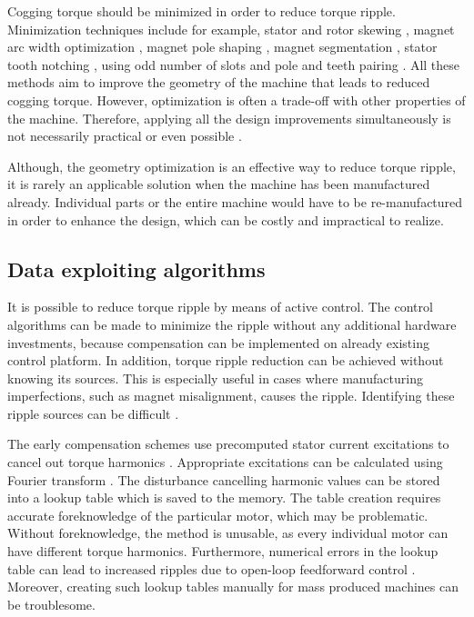 Cogging torque should be minimized in order to reduce torque ripple. Minimization techniques include for example, stator and rotor skewing \cite{CTR_HW:1994, CTR_HW:2001, CTR_HW:2002, CTR_Analytical:2009, CTR_HW:2013}, magnet arc width optimization \cite{CTR_HW:2002, CTR_HW:2003, CTR_HW:2001}, magnet pole shaping \cite{CTR_HW:1994, CTR_HW:2004}, magnet segmentation \cite{CTR_HW:2002, CTR:2010, CTR_SW:2017}, stator tooth notching \cite{CTR_HW:1994, CTR_HW:2002}, using odd number of slots \cite{CTR_HW_SLOTN:2011} and pole and teeth pairing \cite{CTR_HW:2001}. All these methods aim to improve the geometry of the machine that leads to reduced cogging torque. However, optimization is often a trade-off with other properties of the machine. Therefore, applying all the design improvements simultaneously is not necessarily practical or even possible \cite{CTR_HW:2002, CTR_HW:2013}.

Although, the geometry optimization is an effective way to reduce torque ripple, it is rarely an applicable solution when the machine has been manufactured already. Individual parts or the entire machine would have to be re-manufactured in order to enhance the design, which can be costly and impractical to realize.

\subsection{Data exploiting algorithms}
 
It is possible to reduce torque ripple by means of active control. The control algorithms can be made to minimize the ripple without any additional hardware investments, because compensation can be implemented on already existing control platform. In addition, torque ripple reduction can be achieved without knowing its sources. This is especially useful in cases where manufacturing imperfections, such as magnet misalignment, causes the ripple. Identifying these ripple sources can be difficult \cite{TRR_SW:2019}.


The early compensation schemes use precomputed stator current excitations to cancel out torque harmonics \cite{ILC:2005}. Appropriate excitations can be calculated using Fourier transform \cite{CTR_SW:1993, CTR_SW:1994}. The disturbance cancelling harmonic values can be stored into a lookup table which is saved to the memory. The table creation requires accurate foreknowledge of the particular motor, which may be problematic. Without foreknowledge, the method is unusable, as every individual motor can have different torque harmonics. Furthermore, numerical errors in the lookup table can lead to increased ripples due to open-loop feedforward control \cite{ILC:2018}. Moreover, creating such lookup tables manually for mass produced machines can be troublesome.

